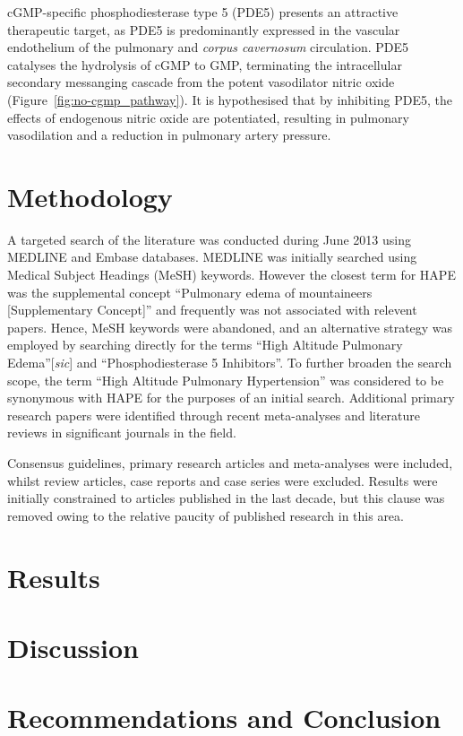 \documentclass[10pt,a4paper]{article}
\begin{document}
cGMP-specific phosphodiesterase type 5 (PDE5) presents an attractive therapeutic target, as PDE5 is predominantly expressed in the vascular endothelium of the pulmonary and \emph{corpus cavernosum} circulation. PDE5 catalyses the hydrolysis of cGMP to GMP, terminating the intracellular secondary messanging cascade from the potent vasodilator nitric oxide (Figure~\ref{fig:no-cgmp_pathway}).\cite{Archer:2009cx} It is hypothesised that by inhibiting PDE5, the effects of endogenous nitric oxide are potentiated, resulting in pulmonary vasodilation and a reduction in pulmonary artery pressure.

\section*{Methodology}

A targeted search of the literature was conducted during June 2013 using MEDLINE and Embase databases. MEDLINE was initially searched using Medical Subject Headings (MeSH) keywords. However the closest term for HAPE was the supplemental concept ``Pulmonary edema of mountaineers [Supplementary Concept]'' and frequently was not associated with relevent papers. Hence, MeSH keywords were abandoned, and an alternative strategy was employed by searching directly for the terms ``High Altitude Pulmonary Edema''[\emph{sic}] and ``Phosphodiesterase 5 Inhibitors''. To further broaden the search scope, the term ``High Altitude Pulmonary Hypertension'' was considered to be synonymous with HAPE for the purposes of an initial search. Additional primary research papers were identified through recent meta-analyses and literature reviews in significant journals in the field.

Consensus guidelines, primary research articles and meta-analyses were included, whilst review articles, case reports and case series were excluded. Results were initially constrained to articles published in the last decade, but this clause was removed owing to the relative paucity of published research in this area.

\section*{Results}

\section*{Discussion}

\section*{Recommendations and Conclusion}




\end{document}
